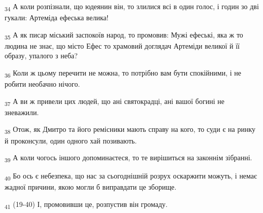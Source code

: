 \begin{tcolorbox}
\textsubscript{34} А коли розпізнали, що юдеянин він, то злилися всі в один голос, і годин зо дві гукали: Артеміда ефеська велика!
\end{tcolorbox}
\begin{tcolorbox}
\textsubscript{35} А як писар міський заспокоїв народ, то промовив: Мужі ефеські, яка ж то людина не знає, що місто Ефес то храмовий доглядач Артеміди великої й її образу, упалого з неба?
\end{tcolorbox}
\begin{tcolorbox}
\textsubscript{36} Коли ж цьому перечити не можна, то потрібно вам бути спокійними, і не робити необачно нічого.
\end{tcolorbox}
\begin{tcolorbox}
\textsubscript{37} А ви ж привели цих людей, що ані святокрадці, ані вашої богині не зневажили.
\end{tcolorbox}
\begin{tcolorbox}
\textsubscript{38} Отож, як Дмитро та його ремісники мають справу на кого, то суди є на ринку й проконсули, один одного хай позивають.
\end{tcolorbox}
\begin{tcolorbox}
\textsubscript{39} А коли чогось іншого допоминаєтеся, то те вирішиться на законнім зібранні.
\end{tcolorbox}
\begin{tcolorbox}
\textsubscript{40} Бо ось є небезпека, що нас за сьогоднішній розрух оскаржити можуть, і немає жадної причини, якою могли б виправдати це зборище.
\end{tcolorbox}
\begin{tcolorbox}
\textsubscript{41} (19-40) І, промовивши це, розпустив він громаду.
\end{tcolorbox}
